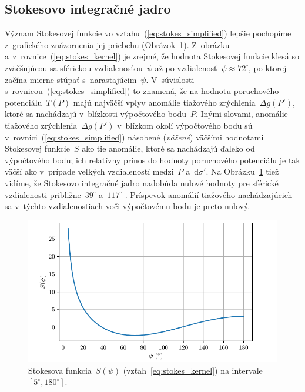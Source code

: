 \documentclass[a4paper, 12pt]{book}
\newcommand{\diff}{\mathrm d}
\begin{document}
\subsection{Stokesovo integračné jadro}
\label{sec:stokes_kernel}

Význam Stokesovej funkcie vo vzťahu~(\ref{eq:stokes_simplified}) lepšie 
pochopíme z~grafického znázornenia jej priebehu 
(Obrázok~\ref{fig:stokes_kernel}).  Z~obrázku 
a~z~rovnice~(\ref{eq:stokes_kernel}) je zrejmé, že hodnota Stokesovej funkcie 
klesá so zväčšujúcou sa sférickou vzdialenosťou~$\psi$ až po vzdialenosť~$\psi 
\approx 72^\circ$, po ktorej začína mierne stúpať s~narastajúcim~$\psi$.  
V~súvislosti s~rovnicou~(\ref{eq:stokes_simplified}) to znamená, že na hodnotu 
poruchového potenciálu~$T(P)$ majú najväčší vplyv anomálie tiažového 
zrýchlenia~$\Delta g(P')$, ktoré sa nachádzajú v~blízkosti výpočtového 
bodu~$P$.  Inými slovami, anomálie tiažového zrýchlenia~$\Delta g(P')$ 
v~blízkom okolí výpočtového bodu sú v~rovnici~(\ref{eq:stokes_simplified}) 
násobené (\emph{vážené}) väčšími hodnotami Stokesovej funkcie~$S$ ako tie 
anomálie, ktoré sa nachádzajú ďaleko od výpočtového bodu; ich relatívny prínos 
do hodnoty poruchového potenciálu je tak väčší ako v~prípade veľkých 
vzdialeností medzi~$P$ a~$\diff\sigma'$.  Na Obrázku~\ref{fig:stokes_kernel} 
tiež vidíme, že Stokesovo integračné jadro nadobúda nulové hodnoty pre sférické 
vzdialenosti približne~$39^\circ$ a~$117^\circ$ \parencite{TorgeGeodesy}.  
Príspevok anomálií tiažového nachádzajúcich sa v~týchto vzdialenostiach voči 
výpočtovému bodu je preto nulový.

\begin{figure}[bt]
\centering
\includegraphics{./fig-stokes-kernel.pdf}
\caption{Stokesova funkcia~$S(\psi)$ (vzťah~\ref{eq:stokes_kernel}) na 
intervale~$[5^\circ, 180^\circ]$.}
\label{fig:stokes_kernel}
\end{figure}
\end{document}
